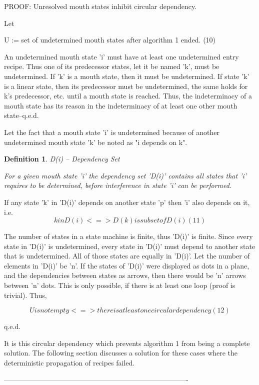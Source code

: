 \documentclass[12pt]{article}
\newtheorem{definition}{Definition}
\begin{document}
PROOF: Unresolved mouth states inhibit circular dependency.

Let 

        U := set of undetermined mouth states after algorithm 1 ended.       (10)

An undetermined mouth state 'i' must have at least one undetermined entry
recipe. Thus one of its predecessor states, let it be named 'k', must be
undetermined. If 'k' is a mouth state, then it must be undetermined.  If state
'k' is a linear state, then its predecessor must be undetermined, the same
holds for k's predecessor, etc. until a mouth state is reached. Thus, the
indeterminacy of a mouth state has its reason in the indeterminacy of at least
one other mouth state--q.e.d. 

Let the fact that a mouth state 'i' is undetermined because of another undetermined
mouth state 'k' be noted as "i depends on k". 

\begin{definition}
D(i) -- Dependency Set 

For a given mouth state 'i' the dependency set 'D(i)' contains all states
that 'i' requires to be determined, before interference in state 'i' can be
performed.
\end{definition}

If any state 'k' in 'D(i)' depends on another state 'p' then 'i' also depends
on it, i.e.
\[
                   k in D(i) <=> D(k) is subset of D(i)                    (11)
\]

The number of states in a state machine is finite, thus 'D(i)' is finite. Since
every state in 'D(i)' is undetermined, every state in 'D(i)' must depend to
another state that is undetermined. All of those states are equally in 'D(i)'.
Let the number of elements in 'D(i)' be 'n'. If the states of 'D(i)' were
displayed as dots in a plane, and the dependencies between states as arrows,
then there would be 'n' arrows between 'n' dots. This is only
possible, if there is at least one loop (proof is trivial). Thus, 

\[
         U is not empty <=> there is at least one circular dependency      (12)
\]

q.e.d.

It is this circular dependency which prevents algorithm 1 from being a complete
solution. The following section discusses a solution for these cases where 
the deterministic propagation of recipes failed.

-------------------------------------------------------------------------------
\end{document}
